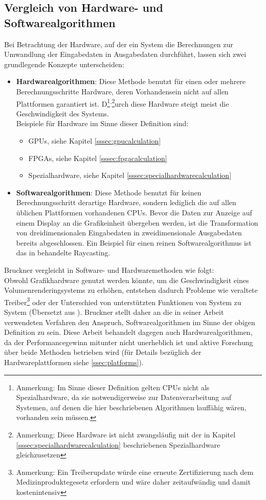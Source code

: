 \documentclass[ngerman,pdftex,paper=A4,DIV=calc,titlepage,12pt]{scrartcl}
\newtheorem[L]{boxedDefinition}{Definition}
\begin{document}
\subsection{Vergleich von Hardware- und Softwarealgorithmen}\label{ssec:swhwcomparison}
Bei Betrachtung der Hardware, auf der ein System die Berechnungen zur Umwandlung der Eingabedaten in Ausgabedaten durchführt, lassen sich zwei grundlegende Konzepte unterscheiden:
\begin{itemize}
 \item \textbf{Hardwarealgorithmen}: Diese Methode benutzt für einen oder mehrere Berechnungsschritte Hardware, deren Vorhandensein nicht auf allen Plattformen garantiert ist. D\footnote{Anmerkung: Im Sinne dieser Definition gelten CPUs nicht als Spezialhardware, da sie notwendigerweise zur Datenverarbeitung auf Systemen, auf denen die hier beschriebenen Algorithmen lauffähig  wären, vorhanden sein müssen.}\textsuperscript{,}\footnote{Anmerkung: Diese Hardware ist nicht zwangsläufig mit der in Kapitel \ref{sssec:specialhardwarecalculation} beschriebenen Spezialhardware gleichzusetzen}urch diese Hardware steigt meist die Geschwindigkeit des Systems.\\
 Beispiele für Hardware im Sinne dieser Definition sind:
 \begin{itemize}
  \item GPUs, siehe Kapitel \vref{sssec:gpucalculation} 
  \item FPGAs, siehe Kapitel \vref{sssec:fpgacalculation}
  \item Spezialhardware, siehe Kapitel \vref{sssec:specialhardwarecalculation}
 \end{itemize}
 \item \textbf{Softwarealgorithmen}: Diese Methode benutzt für keinen Berechnungsschritt derartige Hardware, sondern lediglich die auf allen üblichen Plattformen vorhandenen CPUs. Bevor die Daten zur Anzeige auf einem Display an die Grafikeinheit übergeben werden, ist die Transformation von dreidimensionalen Eingabedaten in zweidimensionale Ausgabedaten bereits abgeschlossen. Ein Beispiel für einen reinen Softwarealgorithmus ist das in \cite{Bruckner2004} behandelte Raycasting.	
\end{itemize}

Bruckner vergleicht in \cite{Bruckner2004} Software- und Hardwaremethoden wie folgt:\\
Obwohl Grafikhardware genutzt werden könnte, um die Geschwindigkeit eines Volumenrenderingsystems zu erhöhen, entstehen dadurch Probleme wie veraltete Treiber\footnote{Anmerkung: Ein Treiberupdate würde eine erneute Zertifizierung nach dem Medizinproduktegesetz erfordern und wäre daher zeitaufwändig und damit kostenintensiv} oder der Unterschied von unterstützten Funktionen von System zu System (Übersetzt aus \cite[Kapitel 3.1.1, Seite 17, Paragraph \glqq Pure Software \grqq]{Bruckner2004}).
Bruckner stellt daher an die in seiner Arbeit verwendeten Verfahren den Anspruch, Softwarealgorithmen im Sinne der obigen Definition zu sein.
Diese Arbeit behandelt dagegen auch Hardwarealgorithmen, da der Performancegewinn mitunter nicht unerheblich ist und aktive Forschung über beide Methoden betrieben wird (für Details bezüglich der Hardwareplattformen siehe \vref{ssec:platforms}).
\end{document}
